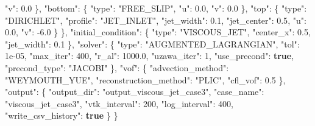 \documentclass[
  10pt,
]{article}
\newenvironment{Shaded}{}{}
\newcommand{\DataTypeTok}[1]{\textcolor[rgb]{0.56,0.13,0.00}{#1}}
\newcommand{\DecValTok}[1]{\textcolor[rgb]{0.25,0.63,0.44}{#1}}
\newcommand{\FloatTok}[1]{\textcolor[rgb]{0.25,0.63,0.44}{#1}}
\newcommand{\FunctionTok}[1]{\textcolor[rgb]{0.02,0.16,0.49}{#1}}
\newcommand{\KeywordTok}[1]{\textcolor[rgb]{0.00,0.44,0.13}{\textbf{#1}}}
\newcommand{\StringTok}[1]{\textcolor[rgb]{0.25,0.44,0.63}{#1}}
\begin{document}
\begin{Shaded}
\begin{Highlighting}[]
      \DataTypeTok{"v"}\FunctionTok{:} \FloatTok{0.0}
    \FunctionTok{\},}
    \DataTypeTok{"bottom"}\FunctionTok{:} \FunctionTok{\{}
      \DataTypeTok{"type"}\FunctionTok{:} \StringTok{"FREE\_SLIP"}\FunctionTok{,}
      \DataTypeTok{"u"}\FunctionTok{:} \FloatTok{0.0}\FunctionTok{,}
      \DataTypeTok{"v"}\FunctionTok{:} \FloatTok{0.0}
    \FunctionTok{\},}
    \DataTypeTok{"top"}\FunctionTok{:} \FunctionTok{\{}
      \DataTypeTok{"type"}\FunctionTok{:} \StringTok{"DIRICHLET"}\FunctionTok{,}
      \DataTypeTok{"profile"}\FunctionTok{:} \StringTok{"JET\_INLET"}\FunctionTok{,}
      \DataTypeTok{"jet\_width"}\FunctionTok{:} \FloatTok{0.1}\FunctionTok{,}
      \DataTypeTok{"jet\_center"}\FunctionTok{:} \FloatTok{0.5}\FunctionTok{,}
      \DataTypeTok{"u"}\FunctionTok{:} \FloatTok{0.0}\FunctionTok{,}
      \DataTypeTok{"v"}\FunctionTok{:} \FloatTok{{-}6.0}
    \FunctionTok{\}}
  \FunctionTok{\},}
  \DataTypeTok{"initial\_condition"}\FunctionTok{:} \FunctionTok{\{}
    \DataTypeTok{"type"}\FunctionTok{:} \StringTok{"VISCOUS\_JET"}\FunctionTok{,}
    \DataTypeTok{"center\_x"}\FunctionTok{:} \FloatTok{0.5}\FunctionTok{,}
    \DataTypeTok{"jet\_width"}\FunctionTok{:} \FloatTok{0.1}
  \FunctionTok{\},}
  \DataTypeTok{"solver"}\FunctionTok{:} \FunctionTok{\{}
    \DataTypeTok{"type"}\FunctionTok{:} \StringTok{"AUGMENTED\_LAGRANGIAN"}\FunctionTok{,}
    \DataTypeTok{"tol"}\FunctionTok{:} \DecValTok{1e{-}05}\FunctionTok{,}
    \DataTypeTok{"max\_iter"}\FunctionTok{:} \DecValTok{400}\FunctionTok{,}
    \DataTypeTok{"r\_al"}\FunctionTok{:} \FloatTok{1000.0}\FunctionTok{,}
    \DataTypeTok{"uzawa\_iter"}\FunctionTok{:} \DecValTok{1}\FunctionTok{,}
    \DataTypeTok{"use\_precond"}\FunctionTok{:} \KeywordTok{true}\FunctionTok{,}
    \DataTypeTok{"precond\_type"}\FunctionTok{:} \StringTok{"JACOBI"}
  \FunctionTok{\},}
  \DataTypeTok{"vof"}\FunctionTok{:} \FunctionTok{\{}
    \DataTypeTok{"advection\_method"}\FunctionTok{:} \StringTok{"WEYMOUTH\_YUE"}\FunctionTok{,}
    \DataTypeTok{"reconstruction\_method"}\FunctionTok{:} \StringTok{"PLIC"}\FunctionTok{,}
    \DataTypeTok{"cfl\_vof"}\FunctionTok{:} \FloatTok{0.5}
  \FunctionTok{\},}
  \DataTypeTok{"output"}\FunctionTok{:} \FunctionTok{\{}
    \DataTypeTok{"output\_dir"}\FunctionTok{:} \StringTok{"output\_viscous\_jet\_case3"}\FunctionTok{,}
    \DataTypeTok{"case\_name"}\FunctionTok{:} \StringTok{"viscous\_jet\_case3"}\FunctionTok{,}
    \DataTypeTok{"vtk\_interval"}\FunctionTok{:} \DecValTok{200}\FunctionTok{,}
    \DataTypeTok{"log\_interval"}\FunctionTok{:} \DecValTok{400}\FunctionTok{,}
    \DataTypeTok{"write\_csv\_history"}\FunctionTok{:} \KeywordTok{true}
  \FunctionTok{\}}
\FunctionTok{\}}
\end{Highlighting}
\end{Shaded}
\end{document}
